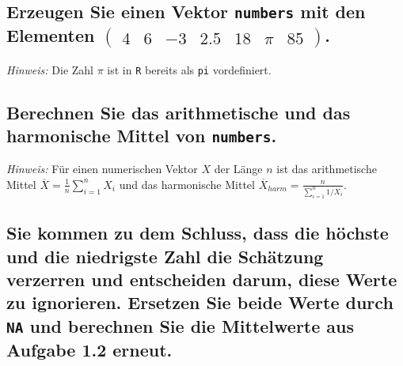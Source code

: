 \documentclass[12pt,a4paper]{article}
\begin{document}
\hypertarget{erzeugen-sie-einen-vektor-mit-den-elementen-beginpmatrix-4-6--3-2.5-18-pi-85-endpmatrix.}{%
\subsection{\texorpdfstring{Erzeugen Sie einen Vektor \texttt{numbers}
mit den Elementen
\(\begin{pmatrix} 4 & 6 & -3 & 2.5 & 18 & \pi & 85 \end{pmatrix}\).}{Erzeugen Sie einen Vektor  mit den Elementen \textbackslash begin\{pmatrix\} 4 \& 6 \& -3 \& 2.5 \& 18 \& \textbackslash pi \& 85 \textbackslash end\{pmatrix\}.}}\label{erzeugen-sie-einen-vektor-mit-den-elementen-beginpmatrix-4-6--3-2.5-18-pi-85-endpmatrix.}}

\emph{Hinweis:} Die Zahl \(\pi\) ist in \texttt{R} bereits als
\texttt{pi} vordefiniert.

\hypertarget{berechnen-sie-das-arithmetische-und-das-harmonische-mittel-von-.}{%
\subsection{\texorpdfstring{Berechnen Sie das arithmetische und das
harmonische Mittel von
\texttt{numbers}.}{Berechnen Sie das arithmetische und das harmonische Mittel von .}}\label{berechnen-sie-das-arithmetische-und-das-harmonische-mittel-von-.}}

\emph{Hinweis:} Für einen numerischen Vektor \(X\) der Länge \(n\) ist
das arithmetische Mittel \(\overline{X} = \frac{1}{n} \sum_{i=1}^n X_i\)
und das harmonische Mittel
\(\overline{X}_{harm} = \frac{n}{\sum_{i=1}^n 1/X_i}\).

\hypertarget{sie-kommen-zu-dem-schluss-dass-die-huxf6chste-und-die-niedrigste-zahl-die-schuxe4tzung-verzerren-und-entscheiden-darum-diese-werte-zu-ignorieren.-ersetzen-sie-beide-werte-durch-und-berechnen-sie-die-mittelwerte-aus-aufgabe-1.2-erneut.}{%
\subsection{\texorpdfstring{Sie kommen zu dem Schluss, dass die höchste
und die niedrigste Zahl die Schätzung verzerren und entscheiden darum,
diese Werte zu ignorieren. Ersetzen Sie beide Werte durch \texttt{NA}
und berechnen Sie die Mittelwerte aus Aufgabe 1.2
erneut.}{Sie kommen zu dem Schluss, dass die höchste und die niedrigste Zahl die Schätzung verzerren und entscheiden darum, diese Werte zu ignorieren. Ersetzen Sie beide Werte durch  und berechnen Sie die Mittelwerte aus Aufgabe 1.2 erneut.}}\label{sie-kommen-zu-dem-schluss-dass-die-huxf6chste-und-die-niedrigste-zahl-die-schuxe4tzung-verzerren-und-entscheiden-darum-diese-werte-zu-ignorieren.-ersetzen-sie-beide-werte-durch-und-berechnen-sie-die-mittelwerte-aus-aufgabe-1.2-erneut.}}
\end{document}
